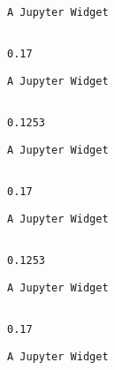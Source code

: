 \documentclass[11pt]{article}
\begin{document}
    
    \begin{verbatim}
A Jupyter Widget
    \end{verbatim}

    
    \begin{Verbatim}[commandchars=\\\{\}]

0.17

    \end{Verbatim}

    
    \begin{verbatim}
A Jupyter Widget
    \end{verbatim}

    
    \begin{Verbatim}[commandchars=\\\{\}]

0.1253

    \end{Verbatim}

    
    \begin{verbatim}
A Jupyter Widget
    \end{verbatim}

    
    \begin{Verbatim}[commandchars=\\\{\}]

0.17

    \end{Verbatim}

    
    \begin{verbatim}
A Jupyter Widget
    \end{verbatim}

    
    \begin{Verbatim}[commandchars=\\\{\}]

0.1253

    \end{Verbatim}

    
    \begin{verbatim}
A Jupyter Widget
    \end{verbatim}

    
    \begin{Verbatim}[commandchars=\\\{\}]

0.17

    \end{Verbatim}

    
    \begin{verbatim}
A Jupyter Widget
    \end{verbatim}
\end{document}
